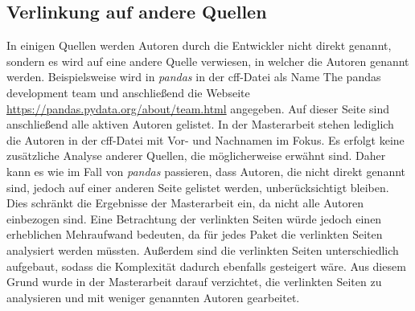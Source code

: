 \subsection*{Verlinkung auf andere Quellen}
\label{sec:verlinkung_auf_andere_quellen}
In einigen Quellen werden Autoren durch die Entwickler nicht direkt genannt, sondern es wird auf eine andere Quelle verwiesen, in welcher die Autoren genannt werden.
Beispielsweise wird in \emph{pandas} in der \gls{cff}-Datei als Name \glqq The pandas development team\grqq{} und anschließend die Webseite \url{https://pandas.pydata.org/about/team.html} angegeben.
Auf dieser Seite sind anschließend alle aktiven Autoren gelistet.
In der Masterarbeit stehen lediglich die Autoren in der \gls{cff}-Datei mit Vor- und Nachnamen im Fokus.
Es erfolgt keine zusätzliche Analyse anderer Quellen, die möglicherweise erwähnt sind.
Daher kann es wie im Fall von \emph{pandas} passieren, dass Autoren, die nicht direkt genannt sind, jedoch auf einer anderen Seite gelistet werden, unberücksichtigt bleiben.
Dies schränkt die Ergebnisse der Masterarbeit ein, da nicht alle Autoren einbezogen sind.
Eine Betrachtung der verlinkten Seiten würde jedoch einen erheblichen Mehraufwand bedeuten, da für jedes Paket die verlinkten Seiten analysiert werden müssten.
Außerdem sind die verlinkten Seiten unterschiedlich aufgebaut, sodass die Komplexität dadurch ebenfalls gesteigert wäre.
Aus diesem Grund wurde in der Masterarbeit darauf verzichtet, die verlinkten Seiten zu analysieren und mit weniger genannten Autoren gearbeitet.

